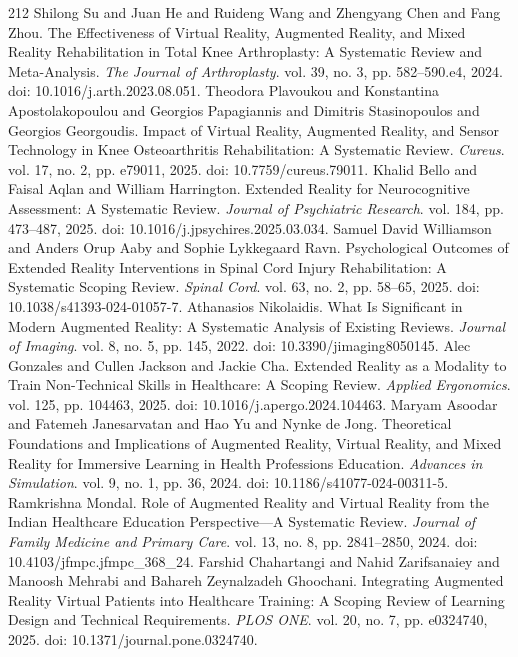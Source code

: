 \begin{thebibliography}{212}
 Shilong Su and Juan He and Ruideng Wang and Zhengyang Chen and Fang Zhou. The Effectiveness of Virtual Reality, Augmented Reality, and Mixed Reality Rehabilitation in Total Knee Arthroplasty: A Systematic Review and Meta-Analysis. \emph{The Journal of Arthroplasty}. vol. 39, no. 3, pp. 582--590.e4, 2024. doi: 10.1016/j.arth.2023.08.051.
 Theodora Plavoukou and Konstantina Apostolakopoulou and Georgios Papagiannis and Dimitris Stasinopoulos and Georgios Georgoudis. Impact of Virtual Reality, Augmented Reality, and Sensor Technology in Knee Osteoarthritis Rehabilitation: A Systematic Review. \emph{Cureus}. vol. 17, no. 2, pp. e79011, 2025. doi: 10.7759/cureus.79011.
 Khalid Bello and Faisal Aqlan and William Harrington. Extended Reality for Neurocognitive Assessment: A Systematic Review. \emph{Journal of Psychiatric Research}. vol. 184, pp. 473--487, 2025. doi: 10.1016/j.jpsychires.2025.03.034.
 Samuel David Williamson and Anders Orup Aaby and Sophie Lykkegaard Ravn. Psychological Outcomes of Extended Reality Interventions in Spinal Cord Injury Rehabilitation: A Systematic Scoping Review. \emph{Spinal Cord}. vol. 63, no. 2, pp. 58--65, 2025. doi: 10.1038/s41393-024-01057-7.
 Athanasios Nikolaidis. What Is Significant in Modern Augmented Reality: A Systematic Analysis of Existing Reviews. \emph{Journal of Imaging}. vol. 8, no. 5, pp. 145, 2022. doi: 10.3390/jimaging8050145.
 Alec Gonzales and Cullen Jackson and Jackie Cha. Extended Reality as a Modality to Train Non-Technical Skills in Healthcare: A Scoping Review. \emph{Applied Ergonomics}. vol. 125, pp. 104463, 2025. doi: 10.1016/j.apergo.2024.104463.
 Maryam Asoodar and Fatemeh Janesarvatan and Hao Yu and Nynke de Jong. Theoretical Foundations and Implications of Augmented Reality, Virtual Reality, and Mixed Reality for Immersive Learning in Health Professions Education. \emph{Advances in Simulation}. vol. 9, no. 1, pp. 36, 2024. doi: 10.1186/s41077-024-00311-5.
 Ramkrishna Mondal. Role of Augmented Reality and Virtual Reality from the Indian Healthcare Education Perspective---A Systematic Review. \emph{Journal of Family Medicine and Primary Care}. vol. 13, no. 8, pp. 2841--2850, 2024. doi: 10.4103/jfmpc.jfmpc_368_24.
 Farshid Chahartangi and Nahid Zarifsanaiey and Manoosh Mehrabi and Bahareh Zeynalzadeh Ghoochani. Integrating Augmented Reality Virtual Patients into Healthcare Training: A Scoping Review of Learning Design and Technical Requirements. \emph{PLOS ONE}. vol. 20, no. 7, pp. e0324740, 2025. doi: 10.1371/journal.pone.0324740.

\end{thebibliography}
